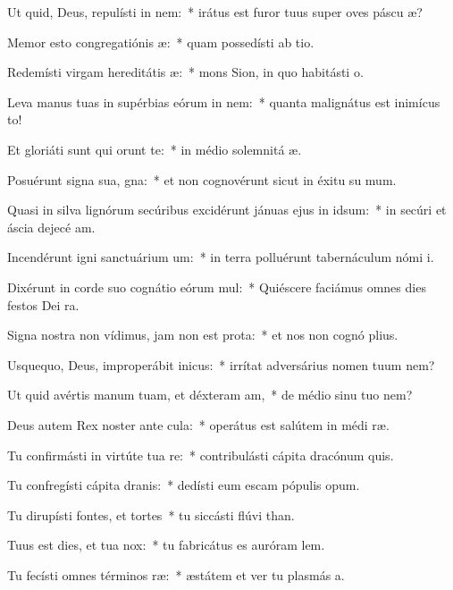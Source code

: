 \item Ut quid, Deus, repulísti in nem:~* irátus est furor tuus super oves páscu æ?
\item Memor esto congregatiónis æ:~* quam possedísti ab tio.
\item Redemísti virgam hereditátis æ:~* mons Sion, in quo habitásti  o.
\item Leva manus tuas in supérbias eórum in nem:~* quanta malignátus est inimícus  to!
\item Et gloriáti sunt qui orunt te:~* in médio solemnitá æ.
\item Posuérunt signa sua, gna:~* et non cognovérunt sicut in éxitu su mum.
\item Quasi in silva lignórum secúribus excidérunt jánuas ejus in idsum:~* in secúri et áscia dejecé am.
\item Incendérunt igni sanctuárium um:~* in terra polluérunt tabernáculum nómi i.
\item Dixérunt in corde suo cognátio eórum mul:~* Quiéscere faciámus omnes dies festos Dei  ra.
\item Signa nostra non vídimus, jam non est prota:~* et nos non cognó plius.
\item Usquequo, Deus, improperábit inicus:~* irrítat adversárius nomen tuum  nem?
\item Ut quid avértis manum tuam, et déxteram am,~* de médio sinu tuo  nem?
\item Deus autem Rex noster ante cula:~* operátus est salútem in médi ræ.
\item Tu confirmásti in virtúte tua re:~* contribulásti cápita dracónum  quis.
\item Tu confregísti cápita dranis:~* dedísti eum escam pópulis opum.
\item Tu dirupísti fontes, et tortes~* tu siccásti flúvi than.
\item Tuus est dies, et tua  nox:~* tu fabricátus es auróram  lem.
\item Tu fecísti omnes términos ræ:~* æstátem et ver tu plasmás a.
